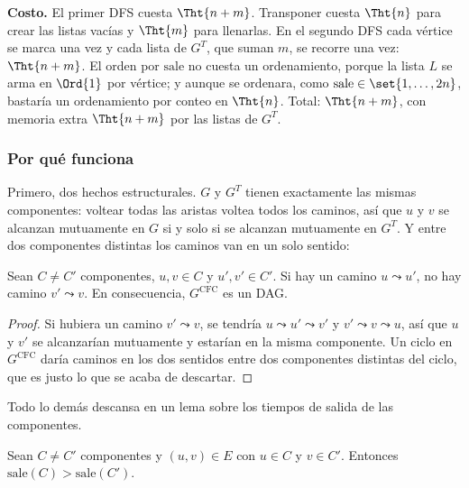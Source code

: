 \documentclass[11pt,letterpaper]{article}
\begin{document}
\textbf{Costo.} El primer DFS cuesta $\Tht{n + m}$. Transponer cuesta
$\Tht{n}$ para crear las listas vacías y $\Tht{m}$ para llenarlas. En
el segundo DFS cada vértice se marca una vez y cada lista de $G^T$, que
suman $m$, se recorre una vez: $\Tht{n + m}$. El orden por
$\text{sale}$ no cuesta un ordenamiento, porque la lista $L$ se arma en
$\Ord{1}$ por vértice; y aunque se ordenara, como
$\text{sale} \in \set{1, \dots, 2n}$, bastaría un ordenamiento por
conteo en $\Tht{n}$. Total: $\Tht{n + m}$, con memoria extra
$\Tht{n + m}$ por las listas de $G^T$.

\subsubsection*{Por qué funciona}

Primero, dos hechos estructurales. $G$ y $G^T$ tienen exactamente las
mismas componentes: voltear todas las aristas voltea todos los caminos,
así que $u$ y $v$ se alcanzan mutuamente en $G$ si y solo si se
alcanzan mutuamente en $G^T$. Y entre dos componentes distintas los
caminos van en un solo sentido:

\begin{lema}
  \label{lem:componentes-dag}
  Sean $C \neq C'$ componentes, $u, v \in C$ y $u', v' \in C'$. Si hay
  un camino $u \leadsto u'$, no hay camino $v' \leadsto v$. En
  consecuencia, $G^{\text{CFC}}$ es un DAG.
\end{lema}

\begin{proof}
  Si hubiera un camino $v' \leadsto v$, se tendría
  $u \leadsto u' \leadsto v'$ y $v' \leadsto v \leadsto u$, así que $u$
  y $v'$ se alcanzarían mutuamente y estarían en la misma componente.
  Un ciclo en $G^{\text{CFC}}$ daría caminos en los dos sentidos entre
  dos componentes distintas del ciclo, que es justo lo que se acaba de
  descartar.
\end{proof}

Todo lo demás descansa en un lema sobre los tiempos de salida de las
componentes.

\begin{lema}
  \label{lem:sale-componentes}
  Sean $C \neq C'$ componentes y $(u, v) \in E$ con $u \in C$ y
  $v \in C'$. Entonces $\text{sale}(C) > \text{sale}(C')$.
\end{lema}
\end{document}
